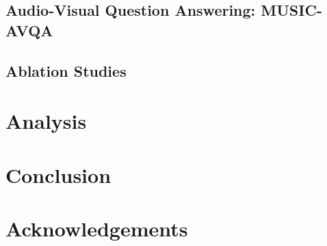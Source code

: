 \documentclass[runningheads]{llncs}
\begin{document}
\subsection{Audio-Visual Question Answering: MUSIC-AVQA}
\label{sec:exp-avqa}


\subsection{Ablation Studies}
\label{sec:exp-ablations}


\section{Analysis}
\label{sec:analysis}


\section{Conclusion}
\label{sec:conclusion}


\section*{Acknowledgements}



\end{document}
